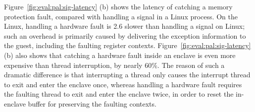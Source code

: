 







Figure~\ref{fig:eval:pal:sig-latency} (b)
shows the latency of catching a memory protection fault,
compared with handling
a  signal in a Linux process.
On the Linux, handling a hardware fault is \roughly{}2.6\x{} slower than handling a  signal on Linux;
such an overhead
is primarily caused by delivering
the exception information to the guest, including the faulting register contexts.
Figure~\ref{fig:eval:pal:sig-latency} (b)
also shows that catching a hardware fault inside an enclave
is even more expensive
than thread interruption, by nearly 60\%.
The reason of such a dramatic difference is that
interrupting a thread only causes the interrupt thread to exit and enter the enclave once,
whereas handling a hardware fault
requires the faulting thread to exit and enter the enclave twice,
in order to reset the in-enclave buffer
for preserving the faulting contexts.


